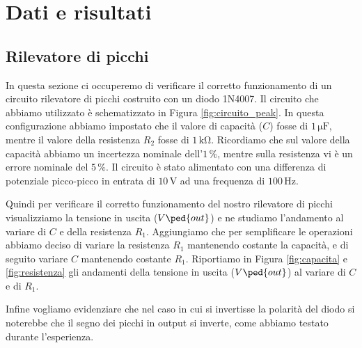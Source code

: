 \section*{Dati e risultati}

\subsection*{Rilevatore di picchi}

In questa sezione ci occuperemo di verificare il corretto funzionamento di un circuito rilevatore di picchi costruito con un diodo 1N4007.
Il circuito che abbiamo utilizzato è schematizzato in Figura \ref{fig:circuito_peak}.
In questa configurazione abbiamo impostato che il valore di capacità ($C$) fosse di $1\,\si{\micro\farad}$, mentre il valore della resistenza $R_2$ fosse di $1\,\si{\kilo\ohm}$. Ricordiamo che sul valore della capacità abbiamo un incertezza nominale dell'$1\,\%$, mentre sulla resistenza vi è un errore nominale del $5\,\%$.
Il circuito è stato alimentato con una differenza di potenziale picco-picco in entrata di $10\,\si{\volt}$ ad una frequenza di $100\,\si{\hertz}$.

Quindi per verificare il corretto funzionamento del nostro rilevatore di picchi visualizziamo la tensione in uscita ($V\ped{out}$) e ne studiamo l'andamento al variare di $C$ e della resistenza $R_1$.
Aggiungiamo che per semplificare le operazioni abbiamo deciso di variare la resistenza $R_1$ mantenendo costante la capacità, e di seguito variare $C$ mantenendo costante $R_1$.
Riportiamo in Figura \ref{fig:capacita} e \ref{fig:resistenza} gli andamenti della
tensione in uscita ($V\ped{out}$) al variare di $C$ e di $R_1$.

Infine vogliamo evidenziare che nel caso in cui si invertisse la polarità del diodo si noterebbe che il segno dei
picchi in output si inverte, come abbiamo testato durante l'esperienza.

